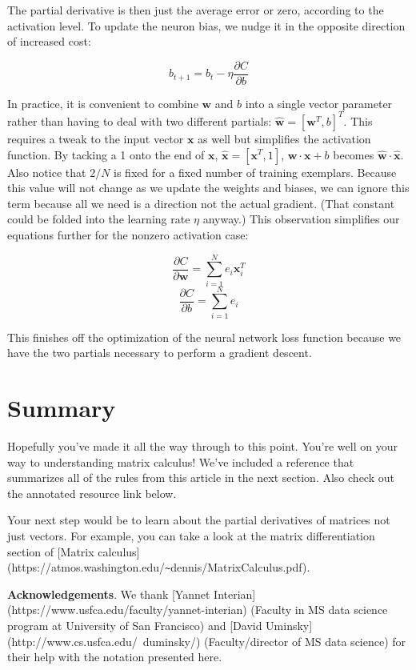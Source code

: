 \documentclass[11pt]{article}
\begin{document}
The partial derivative is then just the average error or zero, according to the activation level. To update the neuron bias, we nudge it in the opposite direction of increased cost:

\[
b_{t+1} = b_{t} - \eta \frac{\partial C}{\partial b}
\]
 
In practice, it is convenient to combine $\mathbf{w}$ and $b$ into a single vector parameter rather than having to deal with two different partials: $\hat{\mathbf{w}} = [\mathbf{w}^T, b]^T$. This requires a tweak to the input vector $\mathbf{x}$ as well but simplifies the activation function. By tacking a 1 onto the end of $\mathbf{x}$, $\hat{\mathbf{x}} = [\mathbf{x}^T,1]$, $\mathbf{w} \cdot \mathbf{x} + b$ becomes $\hat{\mathbf{w}} \cdot \hat{\mathbf{x}}$.  Also notice that $2/N$ is fixed for a fixed number of training exemplars. Because this value will not change as we update the weights and biases, we can ignore this term because all we need is a direction not the actual gradient. (That constant could be folded into the learning rate $\eta$ anyway.) This observation simplifies our equations further for the nonzero activation case:

\[\frac{\partial C}{\partial \mathbf{w}} = \sum_{i=1}^N e_i\mathbf{x}_i^T\]
\[\frac{\partial C}{\partial b} = \sum_{i=1}^N e_i\]

This finishes off the optimization of the neural network loss function because we have the two partials necessary to perform a gradient descent.

\section{Summary}

Hopefully you've made it all the way through to this point.  You're well on your way to understanding matrix calculus!  We've included a reference that summarizes all of the rules from this article in the next section. Also check out the annotated resource link below.

Your next step would be to learn about the partial derivatives of matrices not just vectors. For example, you can take a look at the matrix differentiation section of [Matrix calculus](https://atmos.washington.edu/\verb|~|dennis/MatrixCalculus.pdf). 

{\bf Acknowledgements}. We thank [Yannet Interian](https://www.usfca.edu/faculty/yannet-interian) (Faculty in MS data science program at University of San Francisco) and [David Uminsky](http://www.cs.usfca.edu/~duminsky/) (Faculty/director of MS data science) for their help with the notation presented here.
\end{document}
